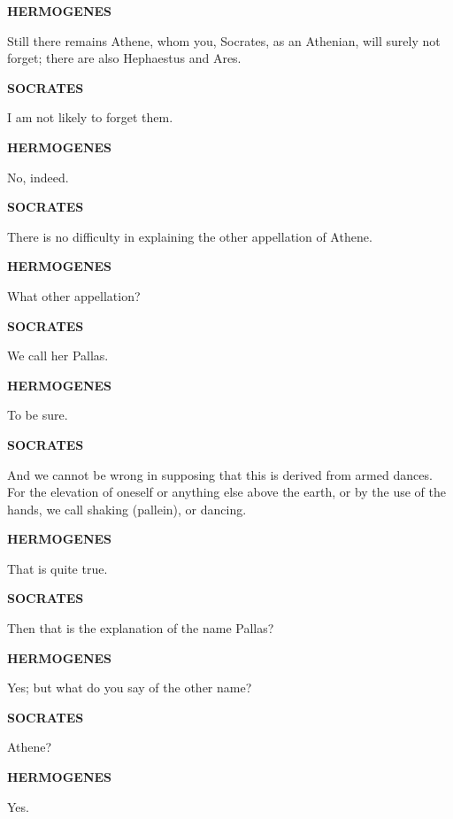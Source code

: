 \documentclass[11pt,letter]{article}
\begin{document}
\par \textbf{HERMOGENES}
\par   Still there remains Athene, whom you, Socrates, as an Athenian, will surely not forget; there are also Hephaestus and Ares.

\par \textbf{SOCRATES}
\par   I am not likely to forget them.

\par \textbf{HERMOGENES}
\par   No, indeed.

\par \textbf{SOCRATES}
\par   There is no difficulty in explaining the other appellation of Athene.

\par \textbf{HERMOGENES}
\par   What other appellation?

\par \textbf{SOCRATES}
\par   We call her Pallas.

\par \textbf{HERMOGENES}
\par   To be sure.

\par \textbf{SOCRATES}
\par   And we cannot be wrong in supposing that this is derived from armed dances. For the elevation of oneself or anything else above the earth, or by the use of the hands, we call shaking (pallein), or dancing.

\par \textbf{HERMOGENES}
\par   That is quite true.

\par \textbf{SOCRATES}
\par   Then that is the explanation of the name Pallas?

\par \textbf{HERMOGENES}
\par   Yes; but what do you say of the other name?

\par \textbf{SOCRATES}
\par   Athene?

\par \textbf{HERMOGENES}
\par   Yes.
\end{document}
